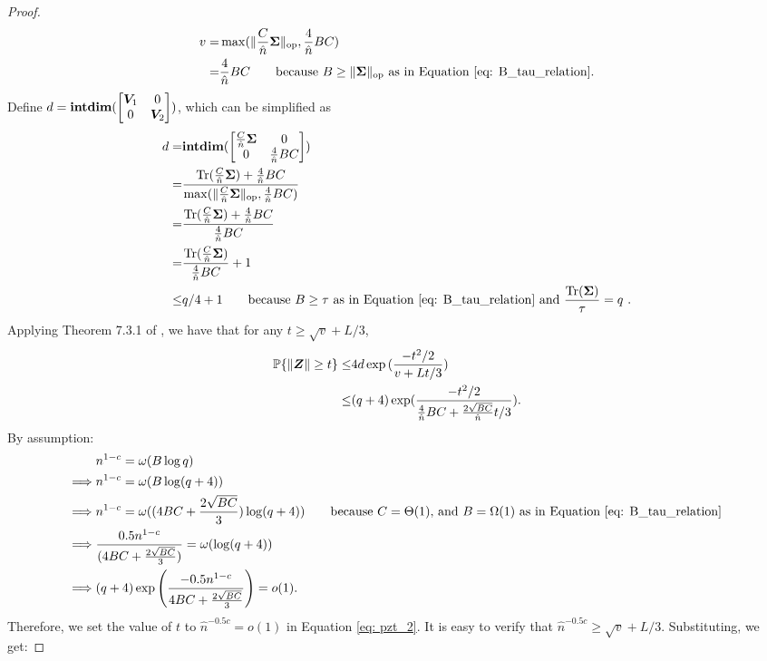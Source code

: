 \begin{proof}
\begin{align}
    \nonumber
     v = &  \max( \lVert  \frac{C}{\hat{n}}{\bm{\Sigma}}  \rVert_{\mathrm{op}}, \frac{4}{\hat{n}} BC ) \\
     \nonumber
     = & \frac{4}{\hat{n}} BC \quad\quad \text{because $B\geq \lVert {\bm{\Sigma}} \rVert_{\mathrm{op}} $ as in Equation \ref{eq: B_tau_relation}}.
\end{align}
Define $d = \textbf{intdim}(\begin{bmatrix} {\bm{V}}_1 & 0 \\ 0 & {\bm{V}}_2 \end{bmatrix})$, which can be simplified as
\begin{align}
    \nonumber
    d = & \textbf{intdim}( \begin{bmatrix}  \frac{C}{\hat{n}}{\bm{\Sigma}}  & 0 \\ 0 & \frac{4}{\hat{n}} BC \end{bmatrix} ) \\
    \nonumber
    = & \frac{ \operatorname{Tr}( \frac{C}{\hat{n}}{\bm{\Sigma}} ) + \frac{4}{\hat{n}} BC }{ \max( \lVert  \frac{C}{\hat{n}}{\bm{\Sigma}}  \rVert_{\mathrm{op}}, \frac{4}{\hat{n}} BC )  } \\
    \nonumber
    = & \frac{ \operatorname{Tr}( \frac{C}{\hat{n}}{\bm{\Sigma}} ) + \frac{4}{\hat{n}} BC }{ \frac{4}{\hat{n}} BC } \\
    \nonumber
    = & \frac{ \operatorname{Tr}( \frac{C}{\hat{n}}{\bm{\Sigma}} )}{ \frac{4}{\hat{n}} BC } + 1\\
    \nonumber
    \leq & q/4+1 \quad\quad \text{because $B\geq \tau$ as in Equation \ref{eq: B_tau_relation} and $\frac{\operatorname{Tr}({\bm{\Sigma}})}{ \tau }=q$ }.
\end{align}
Applying Theorem 7.3.1 of \cite{tropp2015introduction}, we have that for any $t\geq \sqrt{v}+L/3$,
\begin{align}
    \nonumber
   \mathbb{P}\{ \|{\bm{Z}}\| \geq t \}\leq & 4d \exp{ (\frac{-t^2/2}{v+Lt/3} )} \\
\label{eq: pzt_2}
   \leq & (q+4) \exp( \frac{-t^2/2}{\frac{4}{\hat{n}}BC+\frac{2\sqrt{BC}}{\hat{n}} t/3 }  ).
\end{align}
By assumption:
\begin{align}
    \nonumber
& n^{1-c}=\omega(B\log q)\\
\nonumber
\implies &  n^{1-c}=\omega( B\log (q+4)) \\
\nonumber
\implies & n^{1-c}=\omega( (4BC +\frac{2\sqrt{BC}}{3})\log (q+4)) \quad\quad\text{because $C=\Theta(1)$, and $B=\Omega(1)$ as in Equation \ref{eq: B_tau_relation} } \\
\nonumber
\implies & \frac{0.5 n^{1-c}}{(4BC +\frac{2\sqrt{BC}}{3})}=\omega( \log (q+4)) \\
\nonumber
\implies & (q+4)\exp\left( \frac{-0.5 n^{1-c}}{4BC +\frac{2\sqrt{BC}}{3}} \right)  =o(1).
\end{align}
Therefore, we set the value of $t$ to $\hat{n}^{-0.5c} = o(1)$ in Equation \ref{eq: pzt_2}. It is easy to verify that $\hat{n}^{-0.5c} \geq \sqrt{v}+L/3$. Substituting, we get: 

\end{proof}
